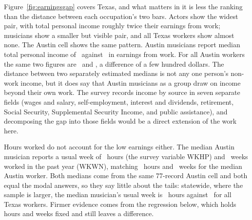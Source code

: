 Figure~\ref{fig:earningsgap} covers Texas, and what matters in it is less the
ranking than the distance between each occupation's two bars. Actors show the
widest pair, with total personal income roughly twice their earnings from
work; musicians show a smaller but visible pair, and all Texas workers show
almost none. The Austin cell shows the same pattern. Austin musicians report
median total personal income of \NPumsAustinMusMedpincpPos\ against
\NPumsAustinMusMedpernpPos\ in earnings from work. For all Austin workers the
same two figures are \NPumsAustinAllworkMedpincpPos\ and
\NPumsAustinAllworkMedpernpPos, a difference of a few hundred dollars.
The distance between two separately estimated medians is not any one person's
non-work income, but it does say that Austin musicians as a group draw on
income beyond their own work. The survey records income by source in seven
separate fields (wages and salary, self-employment, interest and dividends,
retirement, Social Security, Supplemental Security Income, and public
assistance), and decomposing the gap into those fields would be a direct
extension of the work here.

Hours worked do not account for the low earnings either. The median Austin
musician reports a usual week of \NPumsAustinMusMedwkhp\ hours (the survey
variable WKHP) and \NPumsAustinMusMedwkwn\ weeks worked in the past year
(WKWN), matching \NPumsAustinAllworkMedwkhp\ hours and
\NPumsAustinAllworkMedwkwn\ weeks for the median Austin worker. Both medians
come from the same 77-record Austin cell and both equal the modal answers,
so they say little about the tails: statewide, where the sample is larger,
the median musician's usual week is \NPumsTxMusMedwkhp\ hours against
\NPumsTxAllworkMedwkhp\ for all Texas workers. Firmer evidence comes from
the regression below, which holds hours and weeks fixed and still leaves a
difference.

